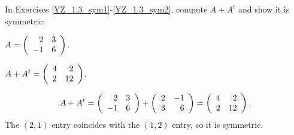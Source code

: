 \documentclass{ximera}
\begin{document}
In Exercises \ref{YZ_1.3_sym1}-\ref{YZ_1.3_sym2}, compute $A+A^t$ and show it is symmetric:
\begin{exercise}\label{YZ_1.3_sym1}
$A=\Matrix{2&3\\-1&6}$.
\begin{solution}

\ans $A+A^t=\Matrix{4&2\\2&12}$.

\soln
\[
A+A^t=\Matrix{2&3\\-1&6}+\Matrix{2&-1\\3&6}=\Matrix{4&2\\2&12}.
\]
The $(2,1)$ entry coincides with the $(1,2)$ entry, so it is symmetric.

\end{solution}
\end{exercise}
\end{document}
